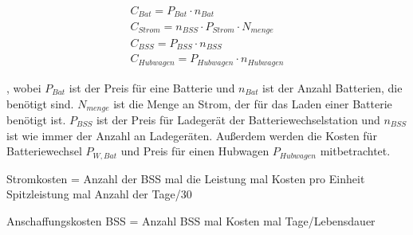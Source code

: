 \begin{equation}
   \begin{split}
  {C_{Bat}} = P_{Bat} \cdot n_{Bat}\\
  {C_{Strom}} = n_{BSS} \cdot P_{Strom} \cdot N_{menge}\\
  {C_{BSS}} = P_{BSS} \cdot n_{BSS} \\
  {C_{Hubwagen}} = P_{Hubwagen} \cdot n_{Hubwagen}
  \label{BA}
   \end{split}
  \end{equation}

, wobei $P_{Bat}$ ist der Preis für eine Batterie und $n_{Bat}$ ist der Anzahl Batterien, die benötigt sind.
$N_{menge}$ ist die Menge an Strom, der für das Laden einer Batterie benötigt ist.
$P_{BSS}$ ist der Preis für Ladegerät der Batteriewechselstation und $n_{BSS}$ ist wie immer der Anzahl an Ladegeräten. 
Außerdem werden die Kosten für
Batteriewechsel $P_{W,Bat}$ und Preis für einen Hubwagen $P_{Hubwagen}$ mitbetrachtet.
  

  Stromkosten = Anzahl der BSS mal die Leistung mal Kosten pro Einheit Spitzleistung mal Anzahl der Tage/30

  Anschaffungskosten BSS = Anzahl BSS mal Kosten mal Tage/Lebensdauer




